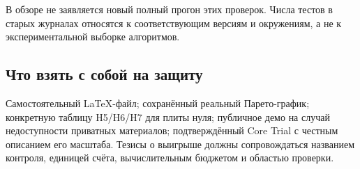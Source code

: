 \documentclass[11pt,a4paper]{article}
\begin{document}
В обзоре не заявляется новый полный прогон этих проверок. Числа тестов в старых журналах относятся к соответствующим версиям и окружениям, а не к экспериментальной выборке алгоритмов.


\subsection{Что взять с собой на защиту}

Самостоятельный LaTeX-файл; сохранённый реальный Парето-график; конкретную таблицу H5/H6/H7 для плиты нуля; публичное демо на случай недоступности приватных материалов; подтверждённый Core Trial с честным описанием его масштаба. Тезисы о выигрыше должны сопровождаться названием контроля, единицей счёта, вычислительным бюджетом и областью проверки.
\end{document}
